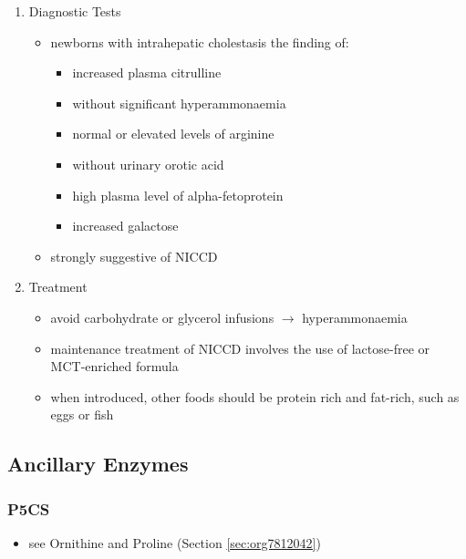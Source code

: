 \documentclass[12pt]{scrartcl}
\begin{document}
\begin{center}
\begin{center}
\begin{enumerate}
\item Diagnostic Tests
\label{sec:org19e23fc}
\begin{itemize}
\item newborns with intrahepatic cholestasis the finding of:
\begin{itemize}
\item increased plasma citrulline
\item without significant hyperammonaemia
\item normal or elevated levels of arginine
\item without urinary orotic acid
\item high plasma level of alpha-fetoprotein
\item \textpm{} increased galactose
\end{itemize}
\item strongly suggestive of  NICCD
\end{itemize}

\item Treatment
\label{sec:org5700e33}
\begin{itemize}
\item avoid carbohydrate or glycerol infusions \(\to\) hyperammonaemia
\item maintenance treatment of NICCD involves the use of lactose-free or
MCT-enriched formula
\item when introduced, other foods should be protein rich and fat-rich,
such as eggs or fish
\end{itemize}
\end{enumerate}
\subsection{Ancillary Enzymes}
\label{sec:orgd46510e}
\subsubsection{P5CS}
\label{sec:org89c48bb}
\begin{itemize}
\item see Ornithine and Proline (Section \ref{sec:org7812042})
\end{itemize}

\end{center}
\end{center}
\end{document}
